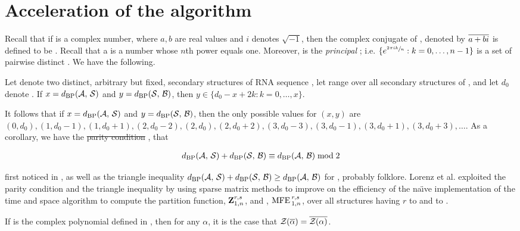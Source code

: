 \documentclass[11pt, oneside]{Thesis} %
\providecommand{\DIFadd}[1]{{\protect\color{blue}\uwave{#1}}} %
\providecommand{\DIFdel}[1]{{\protect\color{red}\sout{#1}}}                      %
\providecommand{\DIFaddbegin}{} %
\providecommand{\DIFaddend}{} %
\providecommand{\DIFdelbegin}{} %
\providecommand{\DIFdelend}{} %
\begin{document}
\section{Acceleration of the \ffttwo algorithm}
\label{sec:ffttwo:perf}

Recall that if \aPbi is a complex number, where $a,b$ are real values and $i$
denotes $\sqrt{-1}$, then the complex conjugate of \aPbi, denoted by
$\overline{a+bi}$ is defined to be \aMbi. Recall that a \nRoU is a number
whose $n$th power equals one. Moreover,
\pRoU is the {\em principal} \nRoU; i.e.
$\{ e^{\sfrac{2 \pi i k}{n}} : k=0,\dots,n-1 \}$ is a set of pairwise distinct
\nRoUs. We have the following.

\begin{lemma}
\label{lem:ffttwo:lemma1}
Let \strAB denote two distinct, arbitrary but fixed,
secondary structures of RNA sequence \seq, let \str range over
all secondary structures of \seq, and let $d_0$ denote \dBP{\strA}{\strB}.
If $x=d_{\text{BP}}(\mathcal A,\,\mathcal S)$ and $y=d_{\text{BP}}(\mathcal S,\,\mathcal B)$, then
$y \in \{ d_0-x+2k: k=0,\dots,x\}$.

It follows that if $x=d_{\text{BP}}(\mathcal A,\,\mathcal S)$ and $y=d_{\text{BP}}(\mathcal S,\,\mathcal B)$,
then the only possible values for
$(x,y)$ are $(0,d_0), (1,d_0-1), (1,d_0+1),
(2,d_0-2), (2,d_0), (2, d_0+2),
(3,d_0-3), (3,d_0-1), (3, d_0+1), (3,d_0+3), \dots$.
As a corollary, we have the \DIFdelbegin %
\DIFdel{parity condition}%
\DIFdelend \DIFaddbegin \DIFadd{parity condition}\DIFaddend , that

\begin{align}
\label{eq:ffttwo:parity}
\dBP{\strA}{\str} + \dBP{\str}{\strB} \equiv \dBP{\strA}{\strB} \bmod 2
\end{align}

first noticed in \citep{hofacker:RNAbor2D}, as well as
the triangle inequality
$d_{\text{BP}}(\mathcal A,\,\mathcal S) + d_{\text{BP}}(\mathcal S,\,\mathcal B) \geq d_{\text{BP}}(\mathcal A,\,\mathcal B)$
for \bpd, probably folklore.
Lorenz et al. \citep{hofacker:RNAbor2D} exploited the parity condition
and the triangle inequality by using sparse matrix methods to improve on
the efficiency of the na\"{\i}ve implementation of the
 time and  space algorithm to compute
the partition function, ${\bf Z}^{r,s}_{1,n}$,
and \mfes, $\text{MFE\,}^{r,s}_{1,n}$, over all
structures having \bpd $r$ to \strA and \str to \strB.
\end{lemma}

\begin{lemma}
\label{lem:ffttwo:lemma2}
If \fullZx is the complex polynomial defined in
, then for any \nRoU
$\alpha$, it is the case that ${\mathcal Z}_{}(\overline{\alpha}) =
\overline{{\mathcal Z}_{}(\alpha)}$.
\end{lemma}
\end{document}
